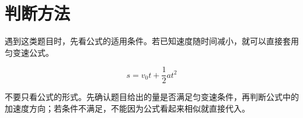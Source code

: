 \section{判断方法}

遇到这类题目时，先看公式的适用条件。若已知速度随时间减小，就可以直接套用匀变速公式。

\begin{equation}
  s=v_0t+\frac{1}{2}at^2
\end{equation}

不要只看公式的形式。先确认题目给出的量是否满足匀变速条件，再判断公式中的加速度方向；若条件不满足，不能因为公式看起来相似就直接代入。
